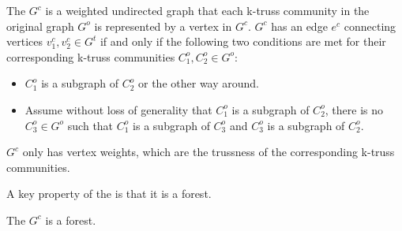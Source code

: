 \begin{Def}[\Treeindex{}]
The \treeindex{} $G^c$ is a weighted undirected graph that each k-truss community in the original graph $G^o$ is represented by a vertex in $G^c$. $G^c$ has an edge $e^c$ connecting vertices $v^{c}_{1}, v^{c}_{2} \in G^{t}$ if and only if the following two conditions are met for their corresponding k-truss communities $C^{o}_{1}, C^{o}_{2} \in G^{o}$:
\begin{itemize}
	\item $C^{o}_{1}$ is a subgraph of $C^{o}_{2}$ or the other way around.
	\item Assume without loss of generality that $C^{o}_{1}$ is a subgraph of $C^{o}_{2}$, there is no $C^{o}_{3} \in G^{o}$ such that $C^{o}_{1}$ is a subgraph of $C^{o}_{3}$ and $C^{o}_{3}$ is a subgraph of $C^{o}_{2}$.
\end{itemize}
$G^c$ only has vertex weights, which are the trussness of the corresponding k-truss communities.
\label{def:\treeindex{}}
\end{Def}

A key property of the \treeindex{} is that it is a forest. 

%

\begin{Thm}
The \treeindex{} $G^c$ is a forest.
\label{thm:forest}
\end{Thm}

